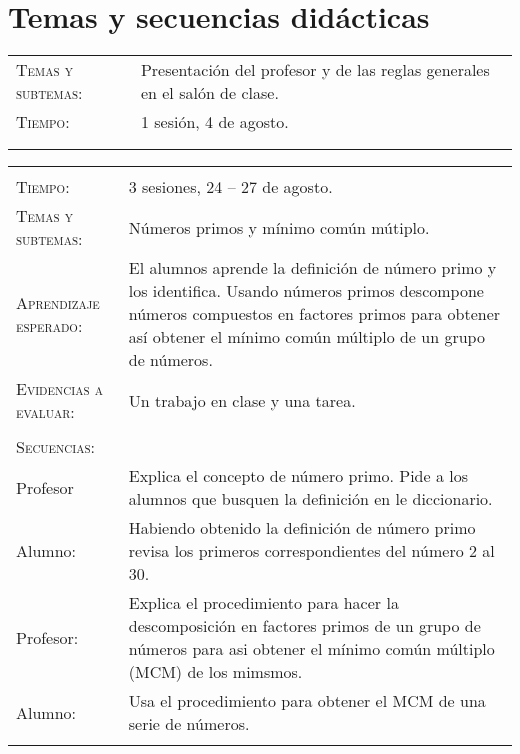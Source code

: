 \documentclass[letterpaper,10pt]{article}
\begin{document}
\section{Temas  y secuencias did\'acticas}
\begin{tabular}[t]{R{0.25\textwidth}p{0.71\textwidth}}
    \textsc{Temas y subtemas:}          & Presentaci\'on del profesor y de las reglas generales en el sal\'on de clase. \\
    \textsc{Tiempo:}                    & 1 sesi\'on, 4 de agosto. \\
\\ \hline \\
\end{tabular}


\begin{tabular}[t]{R{0.25\textwidth}p{0.71\textwidth}}
    \hline \\

    \textsc{Tiempo:}                    & 3 sesiones, 24 -- 27 de agosto. \\
    \textsc{Temas y subtemas:}          & N\'umeros primos y m\'inimo com\'un m\'utiplo. \\
    \textsc{Aprendizaje esperado: }     & El alumnos aprende la definici\'on de
    n\'umero primo y los identifica. Usando n\'umeros primos descompone
    n\'umeros compuestos en factores primos para obtener as\'i obtener el
    m\'inimo com\'un m\'ultiplo de un grupo de n\'umeros. \\
    \textsc{Evidencias a evaluar:}      & Un trabajo en clase y una tarea. \\\\
    \textsc{\large Secuencias:} \\
    Profesor    & Explica el concepto de número primo. Pide a los alumnos que
    busquen la definici\'on en le diccionario. \\ Alumno:     & Habiendo
    obtenido la definici\'on de n\'umero primo revisa los primeros
    correspondientes del n\'umero 2 al 30.\\
    Profesor:   & Explica el procedimiento para hacer la descomposici\'on en factores primos de un grupo de n\'umeros para asi obtener el m\'inimo com\'un m\'ultiplo (MCM) de los mimsmos. \\
    Alumno:     & Usa el procedimiento para obtener el MCM de una serie de n\'umeros. 
    
\\ \hline \\


\end{tabular}
\end{document}
